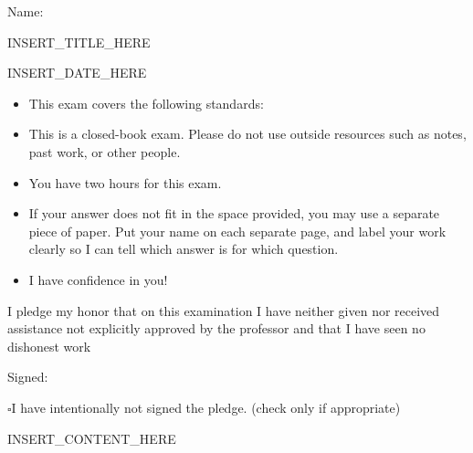 \documentclass[12pt]{article}
\newcommand{\testrulesFinalExam}{
\begin{itemize}
  \item This exam covers the following standards: %
  \item This is a closed-book exam. Please do not use outside resources such as notes, past work, or other people. 
  \item You have two hours for this exam.
  \item If your answer does not fit in the space provided, you may use a separate piece of paper. Put your name on each separate page, and label your work clearly so I can tell which answer is for which question. 
  \item I have confidence in you!
\end{itemize}
}
\newcommand{\pledge}{
I pledge my honor that on this examination I have neither given nor received assistance not explicitly approved by the professor and that I have seen no dishonest work 

\hfill Signed: \makebox[3in]{\hrulefill}

$\square$\quad I have intentionally not signed the pledge. (check only if appropriate)
}
\begin{document}
Name: \makebox[3in]{\hrulefill
\hrulefill}

\vfill

\begin{center}
{\huge INSERT_TITLE_HERE}

{\large INSERT_DATE_HERE}
\end{center}

\testrulesFinalExam

\vfill

\pledge

\newpage

INSERT_CONTENT_HERE
\end{document}
